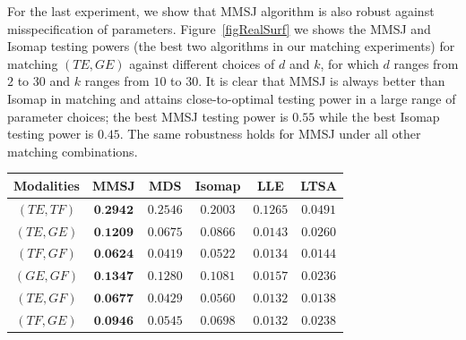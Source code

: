 \documentclass[times,twocolumn,final]{elsarticle}
\newenvironment{Table}
  {\par\bigskip\noindent\minipage{\columnwidth}\centering}
  {\endminipage\par\bigskip}
\begin{document}
For the last experiment, we show that MMSJ algorithm is also robust against misspecification of parameters. Figure~\ref{figRealSurf} we shows the MMSJ and Isomap testing powers (the best two algorithms in our matching experiments) for matching $(TE,GE)$ against different choices of $d$ and $k$, for which $d$ ranges from $2$ to $30$ and $k$ ranges from $10$ to $30$. It is clear that MMSJ is always better than Isomap in matching and attains close-to-optimal testing power in a large range of parameter choices; the best MMSJ testing power is $0.55$ while the best Isomap testing power is $0.45$. The same robustness holds for MMSJ under all other matching combinations. 


\begin{Table}
\centering
{}
\label{table:wikiAcc}%
\begin{tabular}{|c||c|c|c|c|c|}
\hline
Modalities & MMSJ & MDS & Isomap & LLE & LTSA \\
\hline
$(TE, TF)$ & $\textbf{0.2942}$  & $0.2546$ & $0.2003$ & $0.1265$ & $0.0491$\\
\hline
$(TE, GE)$ & $\textbf{0.1209}$  & $0.0675$ & $0.0866$ & $0.0143$ & $0.0260$\\
\hline
$(TF, GF)$ & $\textbf{0.0624}$  & $0.0419$ & $0.0522$ & $0.0134$ & $0.0144$\\
\hline
$(GE, GF)$ & $\textbf{0.1347}$  & $0.1280$ & $0.1081$ & $0.0157$ & $0.0236$\\
\hline
$(TE, GF)$ & $\textbf{0.0677}$  & $0.0429$ & $0.0560$ & $0.0132$ & $0.0138$\\
\hline
$(TF, GE)$ & $\textbf{0.0946}$  & $0.0545$ & $0.0698$ & $0.0132$ & $0.0238$\\
\hline
\end{tabular}
\end{Table}
\end{document}
